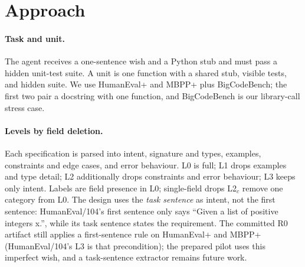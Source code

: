 \documentclass{article}
\title{%
    #1\\[0.7em]
    {\normalsize\normalfont
      Columbia COMS 4705 Project Milestone
    }\\[0.8em]
    \parbox{0.95\textwidth}{%
      \normalfont\small\centering

      \textbf{Keywords:} \textit{#2}
      \par\vspace{0.4em}

      \textbf{TA Mentor:} #3%

      \if\relax\detokenize{#4}\relax\else
        \par\vspace{0.4em}
        \textbf{External Collaborators:} #4%
      \fi

      \if\relax\detokenize{#5}\relax\else
        \par\vspace{0.4em}
        \textbf{Sharing Project:} #5%
      \fi
      \par
    }%
  }%
\author{
  Yanhao Bai \quad Kaitlyn Bassford \quad Wen Tao Koh \\
  Department of Computer Science, Columbia University \\
  \texttt{\{yb2630, kmb2297, wk2439\}@columbia.edu}
}
\begin{document}
\maketitle

\begin{abstract}
Wish-driven programming---stating an intent and letting an agent build the artifact---fails
quietly: the program runs and still violates unwritten requirements. We delete fields
from full specifications mechanically and train a small \emph{silence detector} to predict which
requirement categories a wish leaves implicit, then target clarification questions. This
milestone reports committed artifacts only: 1{,}100 kept tasks, a five-fold out-of-fold detector,
a 45-unit dry run, and a prepared but unrun 100-task pilot. The encoder reaches macro-F1 0.777
(0.629 varying) and AUROC 0.778/0.947/0.736 for examples/constraints/error behaviour; TF-IDF
reaches 0.782/0.909/0.959/0.734, so the encoder is not the strongest detector. No
condition-level results exist yet.
\end{abstract}

\section{Approach}

\paragraph{Task and unit.}
The agent receives a one-sentence wish and a Python stub and must pass a hidden unit-test suite.
A unit is one function with a shared stub, visible tests, and hidden suite. We use HumanEval+ and
MBPP+ \citep{liu2023evalplus} plus BigCodeBench; the first two pair a docstring with one function,
and BigCodeBench is our library-call stress case.

\paragraph{Levels by field deletion.}
Each specification is parsed into intent, signature and types, examples, constraints and edge
cases, and error behaviour. L0 is full; L1 drops examples and type detail; L2 additionally drops
constraints and error behaviour; L3 keeps only intent. Labels are field presence in L0; single-field drops L2$_c$ remove one category from L0. The design uses the \emph{task
sentence} as intent, not the first sentence: HumanEval/104's first sentence only says ``Given a
list of positive integers x.'', while its task sentence states the requirement. The committed R0
artifact still applies a first-sentence rule on HumanEval+ and MBPP+ (HumanEval/104's L3 is
that precondition); the prepared pilot uses this imperfect wish, and a task-sentence extractor
remains future work.
\end{document}
